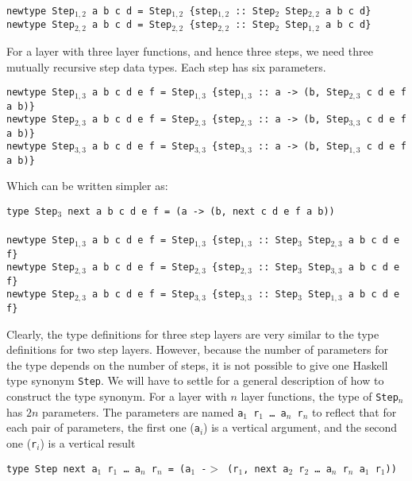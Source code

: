 {\tt newtype Step$_{1,2}$ a b c d = Step$_{1,2}$ \{step$_{1,2}$}\verb| :: |{\tt Step$_2$ Step$_{2,2}$  a b c d\}}\\
{\tt newtype Step$_{2,2}$ a b c d = Step$_{2,2}$ \{step$_{2,2}$}\verb| :: |{\tt Step$_2$ Step$_{1,2}$  a b c d\}}
\par 
\par For a layer with three layer functions, and hence three steps, we need
        three mutually recursive step data types. Each step has six parameters. \par
{\tt newtype Step$_{1,3}$ a b c d e f = Step$_{1,3}$ \{step$_{1,3}$}\verb| :: |{\tt a -> (b, Step$_{2,3}$ c d e f a b)\}}\\
{\tt newtype Step$_{2,3}$ a b c d e f = Step$_{2,3}$ \{step$_{2,3}$}\verb| :: |{\tt a -> (b, Step$_{3,3}$ c d e f a b)\}}\\
{\tt newtype Step$_{3,3}$ a b c d e f = Step$_{3,3}$ \{step$_{3,3}$}\verb| :: |{\tt a -> (b, Step$_{1,3}$ c d e f a b)\}}
\par Which can be written simpler as: \par
{\tt type Step$_3$ next a b c d e f = (a -> (b, next c d e f a b))}\\
\\
{\tt newtype Step$_{1,3}$ a b c d e f = Step$_{1,3}$ \{step$_{1,3}$}\verb| :: |{\tt Step$_3$ Step$_{2,3}$ a b c d e f\} }\\
{\tt newtype Step$_{2,3}$ a b c d e f = Step$_{2,3}$ \{step$_{2,3}$}\verb| :: |{\tt Step$_3$ Step$_{3,3}$ a b c d e f\} }\\
{\tt newtype Step$_{2,3}$ a b c d e f = Step$_{3,3}$ \{step$_{3,3}$}\verb| :: |{\tt Step$_3$ Step$_{1,3}$ a b c d e f\} }
\par Clearly, the type definitions for three step layers are very similar
        to the type definitions for two step layers. However, because the number of
        parameters for the type depends on the number of steps, it is not possible to
        give one Haskell type synonym \texttt{Step}. We will have to settle for a
        general description of how to construct the type synonym. For a layer with $n$
        layer functions, the type of \texttt{Step$_n$} has $2n$ parameters. The
        parameters are named \texttt{a$_1$ r$_1$ \dots ~a$_n$ r$_n$} to reflect that
        for each pair of parameters, the first one (\texttt{a$_i$}) is a vertical
        argument, and the second one (\texttt{r$_i$}) is a vertical result \begin{tabbing}
{\tt type St}\={\tt ep next a$_1$ r$_1$ \dots ~a$_n$ r$_n$ = (a$_1$ -$>$  (r$_1$, next a$_2$ r$_2$ \dots ~a$_n$ r$_n$ a$_1$ r$_1$)) }
\end{tabbing}
